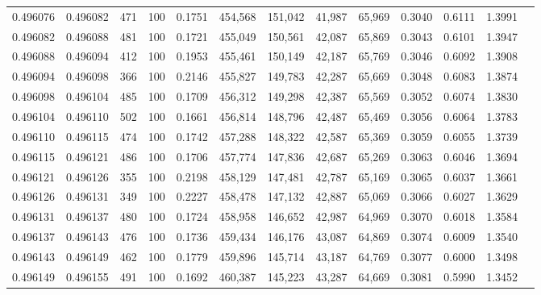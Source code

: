 \begin{tabular}{rrrrrrrrrrrrr}
0.496076 & 0.496082 &   471 & 100 &                                     0.1751 & 454,568 & 151,042 &  41,987 &  65,969 & 0.3040 & 0.6111 & 1.3991 \\
0.496082 & 0.496088 &   481 & 100 &                                     0.1721 & 455,049 & 150,561 &  42,087 &  65,869 & 0.3043 & 0.6101 & 1.3947 \\
0.496088 & 0.496094 &   412 & 100 &                                     0.1953 & 455,461 & 150,149 &  42,187 &  65,769 & 0.3046 & 0.6092 & 1.3908 \\
0.496094 & 0.496098 &   366 & 100 &                                     0.2146 & 455,827 & 149,783 &  42,287 &  65,669 & 0.3048 & 0.6083 & 1.3874 \\
0.496098 & 0.496104 &   485 & 100 &                                     0.1709 & 456,312 & 149,298 &  42,387 &  65,569 & 0.3052 & 0.6074 & 1.3830 \\
0.496104 & 0.496110 &   502 & 100 &                                     0.1661 & 456,814 & 148,796 &  42,487 &  65,469 & 0.3056 & 0.6064 & 1.3783 \\
0.496110 & 0.496115 &   474 & 100 &                                     0.1742 & 457,288 & 148,322 &  42,587 &  65,369 & 0.3059 & 0.6055 & 1.3739 \\
0.496115 & 0.496121 &   486 & 100 &                                     0.1706 & 457,774 & 147,836 &  42,687 &  65,269 & 0.3063 & 0.6046 & 1.3694 \\
0.496121 & 0.496126 &   355 & 100 &                                     0.2198 & 458,129 & 147,481 &  42,787 &  65,169 & 0.3065 & 0.6037 & 1.3661 \\
0.496126 & 0.496131 &   349 & 100 &                                     0.2227 & 458,478 & 147,132 &  42,887 &  65,069 & 0.3066 & 0.6027 & 1.3629 \\
0.496131 & 0.496137 &   480 & 100 &                                     0.1724 & 458,958 & 146,652 &  42,987 &  64,969 & 0.3070 & 0.6018 & 1.3584 \\
0.496137 & 0.496143 &   476 & 100 &                                     0.1736 & 459,434 & 146,176 &  43,087 &  64,869 & 0.3074 & 0.6009 & 1.3540 \\
0.496143 & 0.496149 &   462 & 100 &                                     0.1779 & 459,896 & 145,714 &  43,187 &  64,769 & 0.3077 & 0.6000 & 1.3498 \\
0.496149 & 0.496155 &   491 & 100 &                                     0.1692 & 460,387 & 145,223 &  43,287 &  64,669 & 0.3081 & 0.5990 & 1.3452 \\

\end{tabular}

